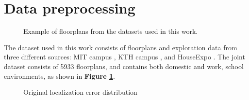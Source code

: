 \section{Data preprocessing} \label{sec:dataset_creation} %

\begin{figure}[ht!]
    \centering
        \hspace{.3in}
        \hspace{.3in}
    \caption{Example of floorplans from the datasets used in this work.}\label{fig:maxExample}
\end{figure}

\noindent
The dataset used in this work  consists of floorplans and exploration data from three different sources: MIT campus \cite{whiting2006geometric}, KTH campus \cite{aydemir2012KTH}, and HouseExpo \cite{li2019houseexpo}. 
The joint dataset consists of 5933 floorplans, and contains both domestic and work, school environments, as shown in \textbf{Figure \ref{fig:maxExample}}.\\

\begin{figure}[ht!]
    \centering
    \caption{Original localization error distribution}\label{fig:dataDistribution}
\end{figure}

